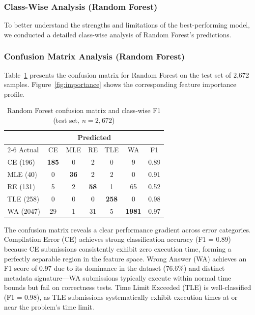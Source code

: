 \documentclass[acmsmall]{acmart}
\begin{document}
\subsubsection*{Class-Wise Analysis (Random Forest)}

To better understand the strengths and limitations of the best-performing
model, we conducted a detailed class-wise analysis of Random Forest's
predictions.

\subsubsection*{Confusion Matrix Analysis (Random Forest)}

Table~\ref{tab:rf-cm} presents the confusion matrix for Random Forest on the
test set of 2,672 samples. Figure~\ref{fig:importance} shows the corresponding
feature importance profile.

\begin{table}[htbp]
\centering
\caption{Random Forest confusion matrix and class-wise F1
         (test set, $n=2{,}672$)}
\label{tab:rf-cm}
\begin{tabular}{@{}lccccc|c@{}}
\toprule
& \multicolumn{5}{c}{Predicted} & \\
\cmidrule{2-6}
Actual & CE & MLE & RE & TLE & WA & F1 \\
\midrule
CE (196)  & \textbf{185}  & 0   & 2   & 0   & 9   & 0.89 \\
MLE (40)  & 0   & \textbf{36}   & 2   & 2   & 0   & 0.91 \\
RE (131)  & 5   & 2   & \textbf{58} & 1   & 65  & 0.52 \\
TLE (258) & 0   & 0   & 0   & \textbf{258} & 0   & 0.98 \\
WA (2047) & 29  & 1   & 31  & 5   & \textbf{1981} & 0.97 \\
\bottomrule
\end{tabular}
\end{table}

The confusion matrix reveals a clear performance gradient across error
categories. Compilation Error (CE) achieves strong classification accuracy
(F1 = 0.89) because CE submissions consistently exhibit zero execution time,
forming a perfectly separable region in the feature space. Wrong Answer (WA)
achieves an F1 score of 0.97 due to its dominance in the dataset (76.6\%) and
distinct metadata signature---WA submissions typically execute within normal
time bounds but fail on correctness tests. Time Limit Exceeded (TLE) is
well-classified (F1 = 0.98), as TLE submissions systematically exhibit
execution times at or near the problem's time limit.
\end{document}

